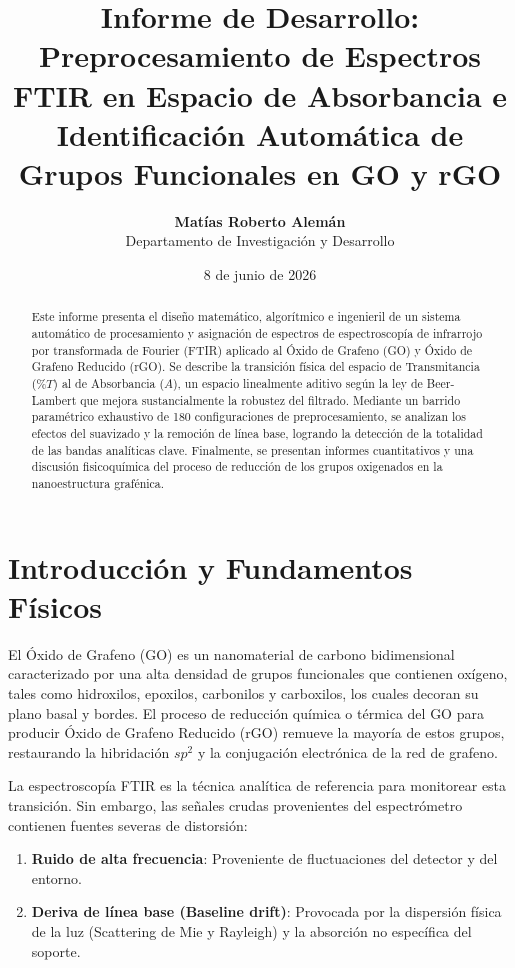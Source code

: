 \documentclass[a4paper,11pt]{article}
\title{\textbf{Informe de Desarrollo: Preprocesamiento de Espectros FTIR en Espacio de Absorbancia e Identificación Automática de Grupos Funcionales en GO y rGO}}
\author{\textbf{Matías Roberto Alemán} \\ Departamento de Investigación y Desarrollo}
\date{8 de junio de 2026}
\begin{document}
\maketitle

\begin{abstract}
Este informe presenta el diseño matemático, algorítmico e ingenieril de un sistema automático de procesamiento y asignación de espectros de espectroscopía de infrarrojo por transformada de Fourier (FTIR) aplicado al Óxido de Grafeno (GO) y Óxido de Grafeno Reducido (rGO). Se describe la transición física del espacio de Transmitancia ($\%T$) al de Absorbancia ($A$), un espacio linealmente aditivo según la ley de Beer-Lambert que mejora sustancialmente la robustez del filtrado. Mediante un barrido paramétrico exhaustivo de 180 configuraciones de preprocesamiento, se analizan los efectos del suavizado y la remoción de línea base, logrando la detección de la totalidad de las bandas analíticas clave. Finalmente, se presentan informes cuantitativos y una discusión fisicoquímica del proceso de reducción de los grupos oxigenados en la nanoestructura grafénica.
\end{abstract}

\tableofcontents

\newpage

\section{Introducción y Fundamentos Físicos}
El Óxido de Grafeno (GO) es un nanomaterial de carbono bidimensional caracterizado por una alta densidad de grupos funcionales que contienen oxígeno, tales como hidroxilos, epoxilos, carbonilos y carboxilos, los cuales decoran su plano basal y bordes. El proceso de reducción química o térmica del GO para producir Óxido de Grafeno Reducido (rGO) remueve la mayoría de estos grupos, restaurando la hibridación $sp^2$ y la conjugación electrónica de la red de grafeno.

La espectroscopía FTIR es la técnica analítica de referencia para monitorear esta transición. Sin embargo, las señales crudas provenientes del espectrómetro contienen fuentes severas de distorsión:
\begin{enumerate}
    \item \textbf{Ruido de alta frecuencia}: Proveniente de fluctuaciones del detector y del entorno.
    \item \textbf{Deriva de línea base (Baseline drift)}: Provocada por la dispersión física de la luz (Scattering de Mie y Rayleigh) y la absorción no específica del soporte.
\end{enumerate}
\end{document}
